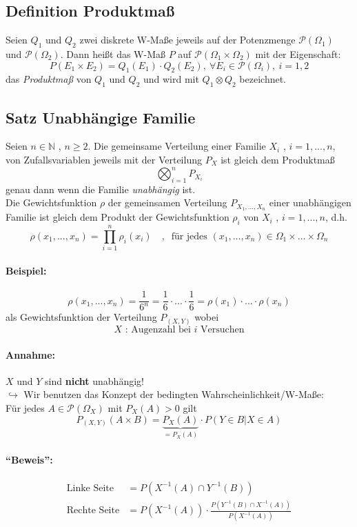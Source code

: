 \documentclass[12pt,a4paper]{article}
\begin{document}
	\subsection{Definition Produktmaß}
	Seien $Q_1$ und $Q_2$ zwei diskrete W-Maße jeweils auf der Potenzmenge $\mathcal{P}(\Omega_1)$ und $\mathcal{P}(\Omega_2)$. Dann heißt das W-Maß $P$ auf $\mathcal{P}(\Omega_1 \times \Omega_2)$ mit der Eigenschaft:
	$$P(E_1 \times E_2)=Q_1(E_1)\cdot Q_2(E_2),\: \forall E_i\in\mathcal{P}(\Omega_i),\: i=1,2$$
	das \textit{Produktmaß} von $Q_1$ und $Q_2$ und wird mit $Q_1 \otimes Q_2$ bezeichnet. 
	
	\subsection{Satz Unabhängige Familie}
	Seien $n\in\mathbb{N}$ , $n\geq2$. Die gemeinsame Verteilung einer Familie $X_i$ , $i=1,...,n$, von Zufallsvariablen jeweils mit der Verteilung $P_X$ ist gleich dem Produktmaß 
	$$\bigotimes_{i=1}^n P_{X_i}$$ 
	genau dann wenn die Familie \textit{unabhängig} ist.\\
	Die Gewichtsfunktion $\rho$ der gemeinsamen Verteilung $P_{X_1, ..., X_n}$ einer unabhängigen Familie ist gleich dem Produkt der Gewichtsfunktion $\rho_i$ von $X_i$ , $i=1,...,n$, d.h.
	$$\rho (x_1,...,x_n)=\prod_{i=1}^n \rho_i (x_i) \quad , \: \text{ für jedes } (x_1,...,x_n)\in\Omega_1 \times ... \times \Omega_n$$
	\paragraph{Beispiel:} 
	$$\rho(x_1,...,x_n)=\frac{1}{6^n}=\frac{1}{6}\cdot ... \cdot \frac{1}{6}=\rho(x_1)\cdot ... \cdot \rho(x_n)$$
	als Gewichtsfunktion der Verteilung $P_{(X,Y)}$ wobei 
	$$X \text{ : Augenzahl bei } i \text{ Versuchen}$$
	
	
	\paragraph{Annahme:}
	$X$ und $Y$ sind \textbf{nicht} unabhängig!\\
	$\hookrightarrow$ Wir benutzen das Konzept der bedingten Wahrscheinlichkeit/W-Maße:\\
	Für jedes $A\in\mathcal{P}(\Omega_X)$ mit $P_X(A)>0$ gilt
	$$P_{(X,Y)}(A\times B)=\underbrace{P_X(A)}_{=P_X(A)}\cdot P(Y\in B | X\in A)$$
	
	\paragraph{``Beweis'':}
	\begin{align*}
	\text{Linke Seite} &= P\left(X^{-1}(A)\cap Y^{-1}(B)\right)\\
	\text{Rechte Seite} &= P\left(X^{-1}(A)\right)\cdot
\frac{P\left(Y^{-1}(B)\cap X^{-1}(A)\right)}{P\left(X^{-1}(A)\right)}
	\end{align*}
\end{document}
